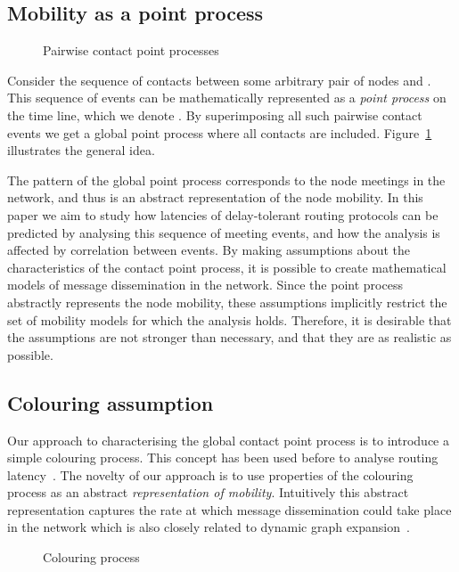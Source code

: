 \documentclass{article}
\begin{document}
\subsection{Mobility as a point process}

\begin{figure}[t]
  \centering
   \caption{Pairwise contact point processes}
  \label{fig:multivariate}
\end{figure}

Consider the sequence of contacts between some arbitrary pair of nodes
 and . This sequence of events can be mathematically represented
as a \emph{point process} on the time line, which we denote
. By superimposing all such pairwise contact events we get
a global point process  where all contacts are
included. Figure~\ref{fig:multivariate} illustrates the general idea.



The pattern of the global point process corresponds to the node
meetings in the network, and thus is an abstract representation of the
node mobility. In this paper we aim to study how latencies of
delay-tolerant routing protocols can be predicted by analysing this
sequence of meeting events, and how the analysis is affected by
correlation between events. By making assumptions about the
characteristics of the contact point process, it is possible to create
mathematical models of message dissemination in the network. Since the
point process abstractly represents the node mobility, these
assumptions implicitly restrict the set of mobility models for which
the analysis holds. Therefore, it is desirable that the assumptions
are not stronger than necessary, and that they are as realistic as
possible.
\subsection{Colouring assumption}
\label{sec:colouringassumption}
Our approach to characterising the global contact point process is to
introduce a simple colouring process. This concept has been used
before to analyse routing latency~\cite{resta11,spyropoulos08}. The
novelty of our approach is to use properties of the colouring process
as an abstract \emph{representation of mobility}. Intuitively this
abstract representation captures the rate at which message
dissemination could take place in the network which is also closely
related to dynamic graph expansion~\cite{asplund12worst}.

\begin{figure}[tb]
  \centering
   \caption{Colouring process}
  \label{fig:colouring}
\end{figure}
\end{document}
